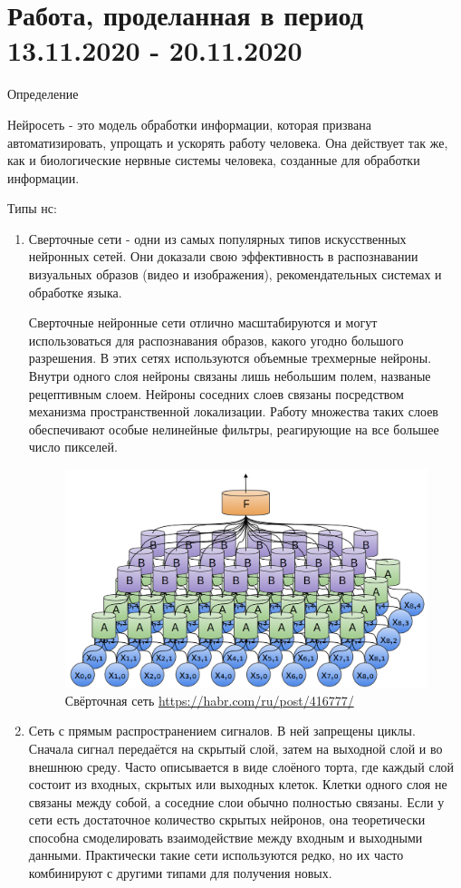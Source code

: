 \documentclass[12pt,a4paper]{report}
\begin{document}
	\section{Работа, проделанная в период 13.11.2020 - 20.11.2020}
	Определение 

Нейросеть  - это модель обработки информации, которая призвана автоматизировать, упрощать и ускорять работу человека. Она действует так же, как и биологические нервные системы человека, созданные для обработки информации. 

 Типы нс: 

\begin{enumerate}
\item Сверточные сети - одни из самых популярных типов искусственных нейронных сетей. Они доказали свою эффективность в распознавании визуальных образов (видео и изображения), рекомендательных системах и обработке языка.

Сверточные нейронные сети отлично масштабируются и могут использоваться для распознавания образов, какого угодно большого разрешения.
В этих сетях используются объемные трехмерные нейроны. Внутри одного слоя нейроны связаны лишь небольшим полем, названые рецептивным слоем.
Нейроны соседних слоев связаны посредством механизма пространственной локализации. Работу множества таких слоев обеспечивают особые нелинейные фильтры, реагирующие на все большее число пикселей.

\begin{figure}
	\centering
	\includegraphics[width=\columnwidth]{sv}
	\caption{Свёрточная сеть
	\url{https://habr.com/ru/post/416777/}}
\end{figure}

\item Сеть с прямым распространением сигналов. В ней запрещены циклы. Сначала сигнал передаётся на скрытый слой, затем на выходной слой и во внешнюю среду. Часто описывается в виде слоёного торта, где каждый слой состоит из входных, скрытых или выходных клеток. Клетки одного слоя не связаны между собой, а соседние слои обычно полностью связаны. Если у сети есть достаточное количество скрытых нейронов, она теоретически способна смоделировать взаимодействие между входным и выходными данными. Практически такие сети используются редко, но их часто комбинируют с другими типами для получения новых.


\end{enumerate}
\end{document}
